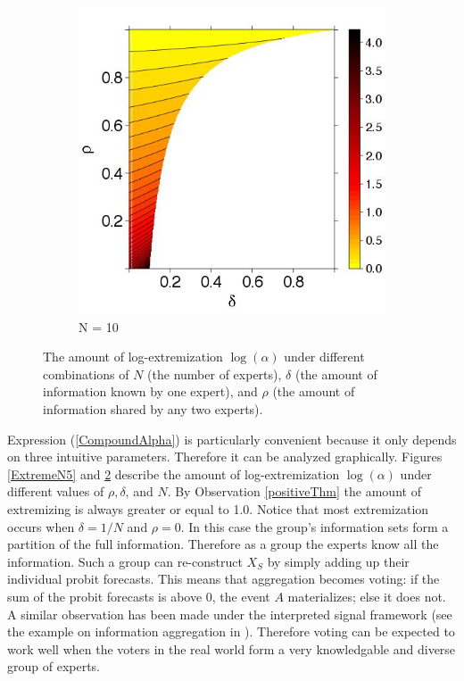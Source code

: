 \documentclass[11pt,twoside]{article}
\theoremstyle{definition}
\theoremstyle{definition}
\begin{document}
\begin{figure}
\begin{subfigure}[b]{0.45\textwidth}
                \includegraphics[width=\textwidth]{ExtremeN10.jpeg}
\caption{N = 10}
\label{ExtremeN30}
        \end{subfigure}
        \caption{ The amount of log-extremization $\log(\alpha)$ under different combinations of $N$ (the number of experts), $\delta$ (the amount of information known by one expert), and $\rho$ (the amount of information shared by any two experts).}
\end{figure}



Expression (\ref{CompoundAlpha}) is particularly convenient because it only depends on three intuitive parameters. Therefore it can be analyzed graphically. Figures \ref{ExtremeN5} and \ref{ExtremeN30} describe the amount of log-extremization $\log(\alpha)$ under different values of $\rho, \delta$, and $N$. By Observation \ref{positiveThm} the amount of extremizing is always greater or equal to 1.0. Notice that most extremization occurs when $\delta = 1/N$ and $\rho = 0$. In this case the group's information sets form a partition of the full information. Therefore as a group the experts know all the information. Such a group can re-construct $X_S$ by simply adding up their individual probit forecasts. This means that aggregation becomes voting: if the sum of the probit forecasts is above 0, the event $A$ materializes; else it does not. A similar observation has been made under the interpreted signal framework (see the example on information aggregation in \cite{hong2009interpreted}). Therefore voting can be expected to work well when the voters in the real world form a very knowledgable and diverse group of experts. 
 
\end{document}
